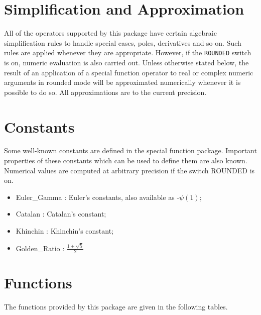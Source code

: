 \section{Simplification and Approximation}

All of the operators supported by this package have certain algebraic
simplification rules to handle special cases, poles, derivatives and so
on.  Such rules are applied whenever they are appropriate.  However, if
the {\tt ROUNDED} switch is on, numeric evaluation is also carried out.
Unless otherwise stated below, the result of an application of a special
function operator to real or complex numeric arguments in rounded mode
will be approximated numerically whenever it is possible to do so.  All
approximations are to the current precision.

\section{Constants}

Some well-known constants are defined in the special function package.
Important properties of these constants which can be used to define them
are also known.  Numerical values are computed at arbitrary precision
if the switch ROUNDED is on.

\begin{itemize}
\item Euler\_Gamma : Euler's constants, also available as -$\psi(1)$;
\item Catalan : Catalan's constant;
\item Khinchin : Khinchin's constant;
\item Golden\_Ratio : $\frac{1 + \sqrt{5}}{2}$ 
\end{itemize}

\section{Functions}

The functions provided by this package are given in the following
tables.


